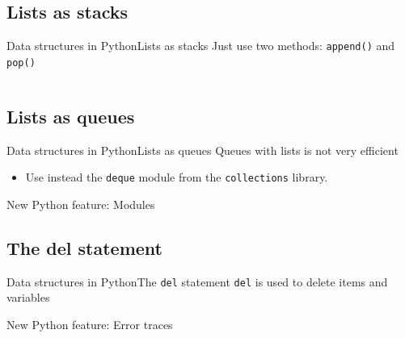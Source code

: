 \documentclass[10pt,compress]{beamer} %
\begin{document}
\subsection{Lists as stacks}
\begin{frame}[fragile]{Data structures in Python}{Lists as stacks}
	Just use two methods: \texttt{append()} and \texttt{pop()}
    
    \begin{columns}
\scriptsize{
		\begin{exampleblock}{}
		\vspace{-0.4cm}
		
		\vspace{-0.2cm}
		\end{exampleblock}
		}
    \end{columns}
\end{frame}

\subsection{Lists as queues}
\begin{frame}[fragile]{Data structures in Python}{Lists as queues}
	Queues with lists is not very efficient
	\begin{itemize}
	\item Use instead the \texttt{deque} module from the \texttt{collections} library.
	\end{itemize}
	\normalsize{
		\begin{block}{}
		\vspace{-0.2cm}
		
		\vspace{-0.2cm}
		\end{block}
		}
	\normalsize{New Python feature: Modules}
\end{frame}

\subsection{The del statement}
\begin{frame}[plain]{Data structures in Python}{The \texttt{del} statement}
	\texttt{del} is used to delete items and variables

	\footnotesize{
		\begin{block}{}
		\vspace{-0.2cm}
		
		\vspace{-0.2cm}
		\end{block}
	}

	\normalsize{New Python feature: Error traces}
\end{frame}
\end{document}
